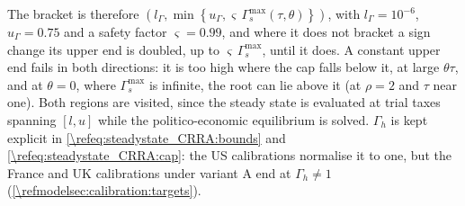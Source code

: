 The bracket is therefore $\left(l_{\Gamma},\min\left\lbrace u_{\Gamma}, \varsigma\,\Gamma_s^{\max}(\tau,\theta)\right\rbrace\right)$, with $l_{\Gamma} = 10^{-6}$, $u_{\Gamma} = 0.75$ and a safety factor $\varsigma = 0.99$, and where it does not bracket a sign change its upper end is doubled, up to $\varsigma\,\Gamma_s^{\max}$, until it does. A constant upper end fails in both directions: it is too high where the cap falls below it, at large $\theta\tau$, and at $\theta = 0$, where $\Gamma_s^{\max}$ is infinite, the root can lie above it (at $\rho = 2$ and $\tau$ near one). Both regions are visited, since the steady state is evaluated at trial taxes spanning $[l,u]$ while the politico-economic equilibrium is solved. $\Gamma_h$ is kept explicit in \eqref{\refeq:steadystate_CRRA:bounds} and \eqref{\refeq:steadystate_CRRA:cap}: the US calibrations normalise it to one, but the France and UK calibrations under variant A end at $\Gamma_h\neq1$ (\cref{\refmodelsec:calibration:targets}).
